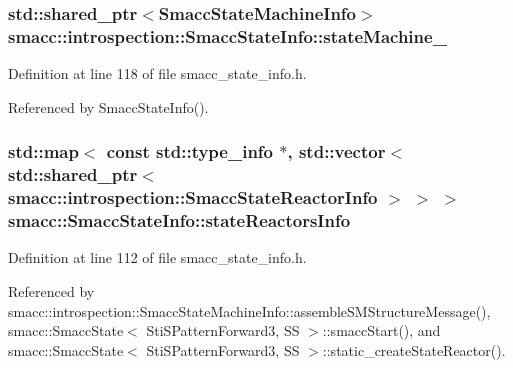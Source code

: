 \subsubsection[{\texorpdfstring{state\+Machine\+\_\+}{stateMachine_}}]{\setlength{\rightskip}{0pt plus 5cm}std\+::shared\+\_\+ptr$<${\bf Smacc\+State\+Machine\+Info}$>$ smacc\+::introspection\+::\+Smacc\+State\+Info\+::state\+Machine\+\_\+}\hypertarget{classsmacc_1_1introspection_1_1SmaccStateInfo_a74685e4540842ee292a80a1db44818bb}{}\label{classsmacc_1_1introspection_1_1SmaccStateInfo_a74685e4540842ee292a80a1db44818bb}


Definition at line 118 of file smacc\+\_\+state\+\_\+info.\+h.



Referenced by Smacc\+State\+Info().

\subsubsection[{\texorpdfstring{state\+Reactors\+Info}{stateReactorsInfo}}]{\setlength{\rightskip}{0pt plus 5cm}std\+::map$<$ const std\+::type\+\_\+info $\ast$, std\+::vector$<$ std\+::shared\+\_\+ptr$<$ {\bf smacc\+::introspection\+::\+Smacc\+State\+Reactor\+Info} $>$ $>$ $>$ smacc\+::\+Smacc\+State\+Info\+::state\+Reactors\+Info\hspace{0.3cm}{\ttfamily [static]}}\hypertarget{classsmacc_1_1introspection_1_1SmaccStateInfo_abd1d6ca5060c87f6bd11fde3e5b2ac4d}{}\label{classsmacc_1_1introspection_1_1SmaccStateInfo_abd1d6ca5060c87f6bd11fde3e5b2ac4d}


Definition at line 112 of file smacc\+\_\+state\+\_\+info.\+h.



Referenced by smacc\+::introspection\+::\+Smacc\+State\+Machine\+Info\+::assemble\+S\+M\+Structure\+Message(), smacc\+::\+Smacc\+State$<$ Sti\+S\+Pattern\+Forward3, S\+S $>$\+::smacc\+Start(), and smacc\+::\+Smacc\+State$<$ Sti\+S\+Pattern\+Forward3, S\+S $>$\+::static\+\_\+create\+State\+Reactor().

